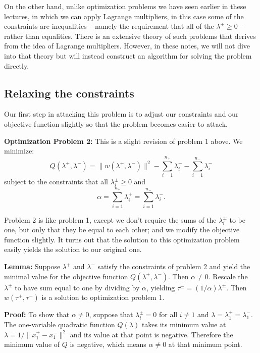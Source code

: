 \documentclass[
  11pt,
  letterpaper,
]{scrbook}
\theoremstyle{plain}
\theoremstyle{remark}
\begin{document}
On the other hand, unlike optimization problems we have seen earlier in
these lectures, in which we can apply Lagrange multipliers, in this case
some of the constraints are inequalities -- namely the requirement that
all of the \(\lambda^{\pm}\ge 0\) -- rather than equalities. There is an
extensive theory of such problems that derives from the idea of Lagrange
multipliers. However, in these notes, we will not dive into that theory
but will instead construct an algorithm for solving the problem
directly.

\hypertarget{relaxing-the-constraints}{%
\subsection{Relaxing the constraints}\label{relaxing-the-constraints}}

Our first step in attacking this problem is to adjust our constraints
and our objective function slightly so that the problem becomes easier
to attack.

\textbf{Optimization Problem 2:} This is a slight revision of problem 1
above. We minimize: \[
Q(\lambda^{+},\lambda^{-}) = \|w(\lambda^{+},\lambda^{-})\|^2-\sum_{i=1}^{n_{+}}\lambda^{+}_{i}-\sum_{i=1}^{n_{-}}\lambda^{-}_{i}
\] subject to the constraints that all \(\lambda^{\pm}_{i}\ge 0\) and \[
\alpha = \sum_{i=1}^{n_{+}}\lambda^+_{i} = \sum_{i=1}^{n_{-}}\lambda^{-}_{i}.
\]

Problem 2 is like problem 1, except we don't require the sums of the
\(\lambda^{\pm}_{i}\) to be one, but only that they be equal to each
other; and we modify the objective function slightly. It turns out that
the solution to this optimization problem easily yields the solution to
our original one.

\textbf{Lemma:} Suppose \(\lambda^{+}\) and \(\lambda^{-}\) satisfy the
constraints of problem 2 and yield the minimal value for the objective
function \(Q(\lambda^{+},\lambda^{-})\). Then \(\alpha\not=0\). Rescale
the \(\lambda^{\pm}\) to have sum equal to one by dividing by
\(\alpha\), yielding \(\tau^{\pm}=(1/\alpha)\lambda^{\pm}\). Then
\(w(\tau^{+},\tau^{-})\) is a solution to optimization problem 1.

\textbf{Proof:} To show that \(\alpha\not=0\), suppose that
\(\lambda^{\pm}_{i}=0\) for all \(i\not=1\) and
\(\lambda=\lambda^{+}_{1}=\lambda^{-}_{1}\). The one-variable quadratic
function \(Q(\lambda)\) takes its minimum value at
\(\lambda=1/\|x_{1}^{+}-x_{1}^{-}\|^2\) and its value at that point is
negative. Therefore the minimum value of \(Q\) is negative, which means
\(\alpha\not=0\) at that minimum point.
\end{document}
